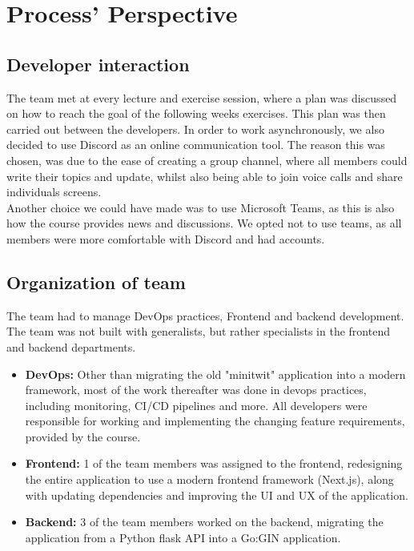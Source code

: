 \section{Process' Perspective}

\subsection{Developer interaction}
The team met at every lecture and exercise session, where a plan was discussed on how to reach the goal of the following weeks exercises. This plan was then carried out between the developers. In order to work asynchronously, we also decided to use Discord as an online communication tool. The reason this was chosen, was due to the ease of creating a group channel, where all members could write their topics and update, whilst also being able to join voice calls and share individuals screens. 
\\
Another choice we could have made was to use Microsoft Teams, as this is also how the course provides news and discussions. We opted not to use teams, as all members were more comfortable with Discord and had accounts.

\subsection{Organization of team}\label{subsec:organization_of_team}
The team had to manage DevOps practices, Frontend and backend development. The team was not built with generalists, but rather specialists in the frontend and backend departments.
\begin{itemize}
    \item \textbf{DevOps:} Other than migrating the old "minitwit" application into a modern framework, most of the work thereafter was done in devops practices, including monitoring, CI/CD pipelines and more. All developers were responsible for working and implementing the changing feature requirements, provided by the course.
    \item \textbf{Frontend:} 1 of the team members was assigned to the frontend, redesigning the entire application to use a modern frontend framework (Next.js), along with updating dependencies and improving the UI and UX of the application.
    \item \textbf{Backend:} 3 of the team members worked on the backend, migrating the application from a Python flask API into a Go:GIN application.
\end{itemize}
